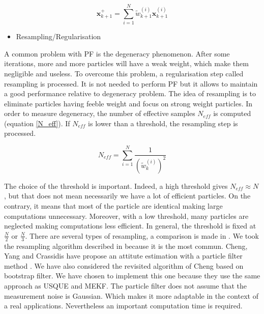 \begin{equation}
 \textbf{x}_{k+1}^+ = \sum_{i=1}^N\tilde{w}_{k+1}^{(i)} \textbf{x}_{k+1}^{(i)}
 \end{equation}



\begin{itemize}
\item Resampling/Regularisation
\end{itemize}

A common problem with PF is the degeneracy phenomenon. After some iterations, more and more particles will have a weak weight, which make them negligible and useless.  To overcome this problem, a regularisation step called resampling is processed. It is not needed to perform PF but it allows to maintain a good performance relative to degeneracy problem. The idea of resampling is to eliminate particles having feeble weight and focus on strong weight particles. In order to measure degeneracy, the number of effective samples $N_{eff}$ is computed (equation \ref{N_eff}). If  $N_{eff}$ is lower than a threshold, the resampling step is processed.

\begin{equation}
 N_{eff} = \sum_{i=1}^N\frac{1}{(\tilde{w}_k^{(i)})^2}
 \label{N_eff}
 \end{equation}


The choice of the threshold is important. Indeed, a high threshold gives $N_{eff} \approx N$, but that does not mean necessarily we have a lot of efficient particles. On the contrary, it means that most of the particle are identical making large computations unnecessary. Moreover, with a low threshold, many particles are neglected making computations less efficient. In general, the threshold is fixed at  $\frac{N}{2}$ or $\frac{N}{3}$. There are several types of resampling, a comparison is made in \cite{douc2005comparison}. We took the resampling algorithm described in \cite{arulampalam2002tutorial} because it is the most commun. Cheng, Yang and Crassidis have propose an attitute estimation with a particle filter method \cite{cheng_particle_2010}. We have also considered the revisited algorithm of Cheng \cite{chang_particle_2014} based on bootstrap filter\cite{gordon1993novel}. We have chosen to implement this one because they use the same approach as USQUE  and MEKF.  The particle filter does not assume that the measurement noise is Gaussian. Which makes it more adaptable in the context of a real applications. Nevertheless an important computation time is required. 


